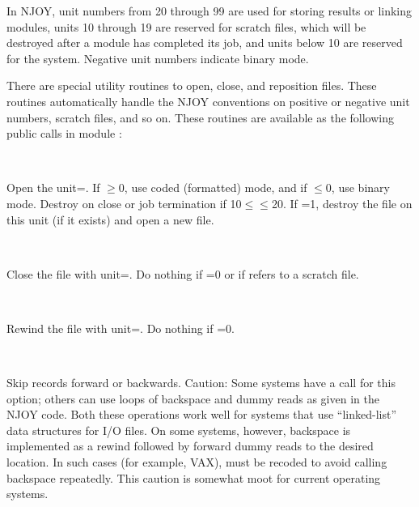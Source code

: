 In NJOY, unit numbers from 20 through 99 are used for storing results or
linking modules, units 10 through 19 are reserved for scratch files,
which will be destroyed after a module has completed its job, and units
below 10 are reserved for the system.  Negative unit numbers indicate
binary mode.

There are special utility routines to open, close, and reposition files.
These routines automatically handle the NJOY conventions on positive or
negative unit numbers, scratch files, and so on.  These routines are
available as the following public calls in module
:
\begin{description}
\begin{singlespace}
\item[\cword{openz(lun,new)}] ~\par
Open the unit=.  If $\geq$0, use coded
(formatted) mode, and if $\leq$0, use binary mode.
Destroy on close or job termination if 10$\leq$$\leq$20.
If =1, destroy the file on this unit (if it exists)
and open a new file.

\item[\cword{closz(lun)}] ~\par
Close the file with unit=.  Do nothing if
=0 or if  refers to a scratch file.

\item[\cword{repoz(ntape)}] ~\par
Rewind the file with unit=.
Do nothing if =0.

\item[\cword{skiprz(lun,nrec)}] ~\par
Skip  records forward or backwards.
Caution: Some systems have a call for this option; others can use
loops of backspace and dummy reads as given in the NJOY code.
Both these operations work well for systems that use
``linked-list'' data structures for I/O files.  On some systems,
however, backspace is implemented as a rewind followed by forward
dummy reads to the desired location.  In such cases (for example,
VAX),  must be recoded to avoid calling backspace
repeatedly.  This caution is somewhat moot for current operating
systems.
\end{singlespace}
\end{description}

